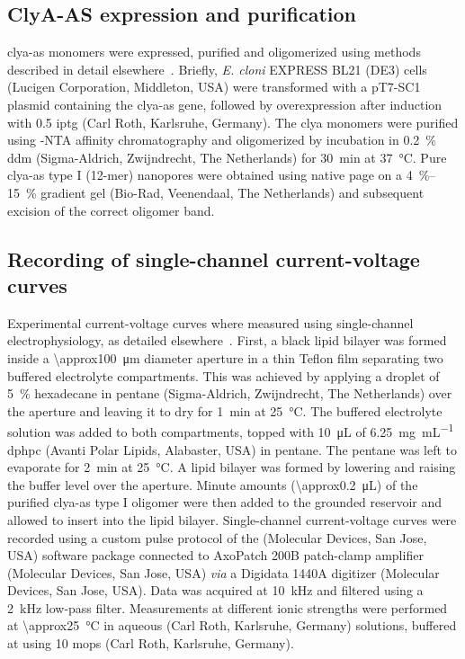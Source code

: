 \subsection{{ClyA-AS} expression and purification}
%

\Gls{clya-as} monomers were expressed, purified and oligomerized using methods described in detail
elsewhere~\cite{Soskine-2012,Soskine-2013}. Briefly, \textit{E. cloni} {EXPRESS BL21} (DE3) cells (Lucigen
Corporation, Middleton, USA) were transformed with a {pT7-SC1} plasmid containing the \gls{clya-as} gene,
followed by overexpression after induction with \SI{0.5}{\mM} \gls{iptg} (Carl Roth, Karlsruhe, Germany). The
\gls{clya} monomers were purified using -NTA affinity chromatography and oligomerized by incubation in
\SI{0.2}{\percent} \gls{ddm} (Sigma-Aldrich, Zwijndrecht, The Netherlands) for \SI{30}{\minute} at
\SI{37}{\celsius}. Pure \gls{clya-as} {type I} (12-mer) nanopores were obtained using native \gls{page} on a
\SIrange[range-phrase = --]{4}{15}{\percent} gradient gel (Bio-Rad, Veenendaal, The Netherlands) and
subsequent excision of the correct oligomer band.

\subsection{Recording of single-channel current-voltage curves}
%

Experimental current-voltage curves where measured using single-channel electrophysiology, as detailed
elsewhere~\cite{Maglia-2010,Soskine-2012,Soskine-2013}. First, a black lipid bilayer was formed inside a
\SI{\approx100}{\um} diameter aperture in a thin Teflon film separating two buffered electrolyte compartments.
This was achieved by applying a droplet of \SI{5}{\percent} hexadecane in pentane (Sigma-Aldrich, Zwijndrecht,
The Netherlands) over the aperture and leaving it to dry for \SI{1}{\minute} at \SI{25}{\celsius}. The
buffered electrolyte solution was added to both compartments, topped with \SI{10}{\uL} of
\SI{6.25}{\milli\gram\per\milli\liter} \gls{dphpc} (Avanti Polar Lipids, Alabaster, USA) in pentane. The
pentane was left to evaporate for \SI{2}{\minute} at \SI{25}{\celsius}. A lipid bilayer was formed by lowering
and raising the buffer level over the aperture. Minute amounts (\SI{\approx0.2}{\uL}) of the purified
\gls{clya-as} {type I} oligomer were then added to the grounded \cisi{} reservoir and allowed to insert into
the lipid bilayer. Single-channel current-voltage curves were recorded using a custom pulse protocol of the
 (Molecular Devices, San Jose, USA) software package connected to AxoPatch 200B patch-clamp
amplifier (Molecular Devices, San Jose, USA) \textit{via} a Digidata 1440A digitizer (Molecular Devices, San
Jose, USA). Data was acquired at \SI{10}{\kHz} and filtered using a \SI{2}{\kHz} low-pass filter. Measurements
at different ionic strengths were performed at \SI{\approx25}{\celsius} in aqueous  (Carl Roth,
Karlsruhe, Germany) solutions, buffered at  using \SI{10}{\mM} \gls{mops} (Carl Roth, Karlsruhe,
Germany).



